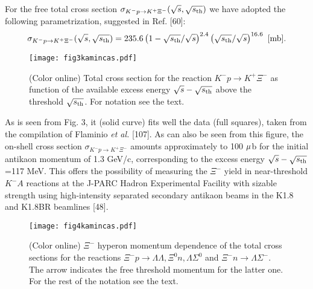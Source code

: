 \documentclass[12pt]{article}
\begin{document}
For the free total cross section
$\sigma_{{K^{-}}p \to {K^+}{\Xi^-}}(\sqrt{s},\sqrt{s_{\rm th}})$ we have adopted the
following parametrization, suggested in Ref. [60]:
\begin{equation}
\sigma_{{K}^-p \to {K^+}{\Xi^-}}(\sqrt{s},\sqrt{s_{\rm th}})=
	235.6\left(1-\sqrt{s_{\rm th}}/\sqrt{s}\right)^{2.4}
               \left(\sqrt{s_{\rm th}}/\sqrt{s}\right)^{16.6}~[{\rm mb}].
\end{equation}
\begin{figure}[htb]
\begin{center}
\texttt{[image: fig3kamincas.pdf]}
\vspace*{-2mm} \caption{(Color online) Total cross section for the reaction $K^-p \to {K^+}{\Xi^-}$
as function of the available excess energy $\sqrt{s}-\sqrt{s_{\rm th}}$
above the threshold $\sqrt{s_{\rm th}}$. For notation see the text.}
\label{void}
\end{center}
\end{figure}
As is seen from Fig. 3, it (solid curve) fits well the data (full squares),
taken from the compilation of Flaminio {\it et al.} [107].
As can also be seen from this figure, the on-shell cross section $\sigma_{{K}^-p \to {K^+}{\Xi^-}}$
amounts approximately to 100 ${\rm \mu}$b for the initial antikaon momentum of 1.3 GeV/c, corresponding
to the excess energy $\sqrt{s}-\sqrt{s_{\rm th}}$=117 MeV.
This offers the possibility of measuring the $\Xi^-$ yield in near-threshold $K^-A$ reactions
at the J-PARC Hadron Experimental Facility with sizable strength using high-intensity separated secondary
antikaon beams in the K1.8 and K1.8BR beamlines [48].
\begin{figure}[htb]
\begin{center}
\texttt{[image: fig4kamincas.pdf]}
\vspace*{-2mm} \caption{(Color online) $\Xi^-$ hyperon momentum dependence of the total
cross sections for the reactions $\Xi^-p \to {\Lambda}{\Lambda},{\Xi^0}{n},{\Lambda}{\Sigma^0}$
and $\Xi^-n \to {\Lambda}{\Sigma^-}$. The arrow indicates the free threshold momentum for the latter one.
For the rest of the notation see the text.}
\label{void}
\end{center}
\end{figure}
\end{document}

